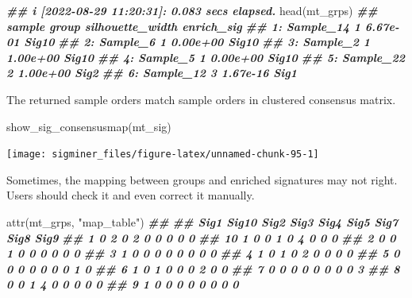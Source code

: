 \documentclass[
  12pt,
  a4paper,
  twoside]{book}
\newenvironment{Shaded}{\begin{snugshade}}{\end{snugshade}}
\newcommand{\DocumentationTok}[1]{\textcolor[rgb]{0.56,0.35,0.01}{\textbf{\textit{#1}}}}
\newcommand{\FunctionTok}[1]{\textcolor[rgb]{0.00,0.00,0.00}{#1}}
\newcommand{\NormalTok}[1]{#1}
\newcommand{\StringTok}[1]{\textcolor[rgb]{0.31,0.60,0.02}{#1}}
\begin{document}
\begin{Shaded}
\begin{Highlighting}[]
\DocumentationTok{\#\# i [2022{-}08{-}29 11:20:31]: 0.083 secs elapsed.}
\FunctionTok{head}\NormalTok{(mt\_grps)}
\DocumentationTok{\#\#       sample group silhouette\_width enrich\_sig}
\DocumentationTok{\#\# 1: Sample\_14     1         6.67e{-}01      Sig10}
\DocumentationTok{\#\# 2:  Sample\_6     1         0.00e+00      Sig10}
\DocumentationTok{\#\# 3:  Sample\_2     1         1.00e+00      Sig10}
\DocumentationTok{\#\# 4:  Sample\_5     1         0.00e+00      Sig10}
\DocumentationTok{\#\# 5: Sample\_22     2         1.00e+00       Sig2}
\DocumentationTok{\#\# 6: Sample\_12     3         1.67e{-}16       Sig1}
\end{Highlighting}
\end{Shaded}

The returned sample orders match sample orders in clustered consensus matrix.

\begin{Shaded}
\begin{Highlighting}[]
\FunctionTok{show\_sig\_consensusmap}\NormalTok{(mt\_sig)}
\end{Highlighting}
\end{Shaded}

\texttt{[image: sigminer\_files/figure-latex/unnamed-chunk-95-1]}

Sometimes, the mapping between groups and enriched signatures may not right. Users should check it and even correct it manually.

\begin{Shaded}
\begin{Highlighting}[]
\FunctionTok{attr}\NormalTok{(mt\_grps, }\StringTok{"map\_table"}\NormalTok{)}
\DocumentationTok{\#\#     }
\DocumentationTok{\#\#      Sig1 Sig10 Sig2 Sig3 Sig4 Sig5 Sig7 Sig8 Sig9}
\DocumentationTok{\#\#   1     0     2    0    2    0    0    0    0    0}
\DocumentationTok{\#\#   10    1     0    0    1    0    4    0    0    0}
\DocumentationTok{\#\#   2     0     0    1    0    0    0    0    0    0}
\DocumentationTok{\#\#   3     1     0    0    0    0    0    0    0    0}
\DocumentationTok{\#\#   4     1     0    1    0    2    0    0    0    0}
\DocumentationTok{\#\#   5     0     0    0    0    0    0    0    1    0}
\DocumentationTok{\#\#   6     1     0    1    0    0    0    2    0    0}
\DocumentationTok{\#\#   7     0     0    0    0    0    0    0    0    3}
\DocumentationTok{\#\#   8     0     0    1    4    0    0    0    0    0}
\DocumentationTok{\#\#   9     1     0    0    0    0    0    0    0    0}
\end{Highlighting}
\end{Shaded}
\end{document}
